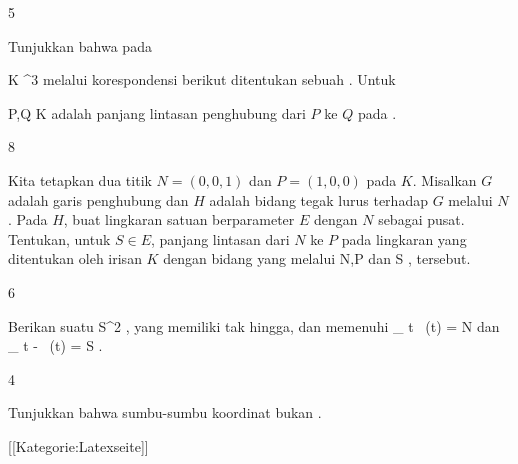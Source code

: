{5}
{

Tunjukkan bahwa pada

\mavergleichskette
{\vergleichskette
{ K
}
{ \subset }{ \R^3
}
{  }{
}
{    }{
}
{   }{
}
}
{}{}{}
melalui korespondensi berikut ditentukan sebuah
 . Untuk

\mavergleichskette
{\vergleichskette
{ P,Q
}
{ \in }{ K
}
{  }{
}
{    }{
}
{   }{
}
}
{}{}{}
 adalah panjang lintasan penghubung
 {} {} dari $P$ ke $Q$ pada
 {} {.}

}
{} {}

{8}
{

Kita tetapkan dua titik $N=(0,0,1)$ dan $P=(1,0,0)$ pada
 $K$. Misalkan $G$ adalah garis penghubung dan $H$ adalah bidang tegak lurus terhadap $G$ melalui $N$. Pada $H$, buat lingkaran satuan berparameter $E$ dengan $N$ sebagai pusat. Tentukan, untuk $S \in E$, panjang lintasan
 {} {} dari $N$ ke $P$ pada lingkaran yang ditentukan oleh irisan $K$ dengan bidang yang melalui
\mathkor {} {N,P} {dan} {S} {},
tersebut.

}
{} {}

{6}
{

Berikan suatu
\maabbdisp {\varphi} {\R} {S^2
} {,}
yang
 {} {}
memiliki
tak hingga, dan memenuhi
\mathkor {} {_{   t  \rightarrow  \infty  } \, \varphi (t) = N} {dan} {_{   t  \rightarrow  - \infty  } \, \varphi (t) = S} {}.

}
{} {}

{4}
{

Tunjukkan bahwa sumbu-sumbu koordinat bukan
.

}
{} {}

 [[Kategorie:Latexseite]]
